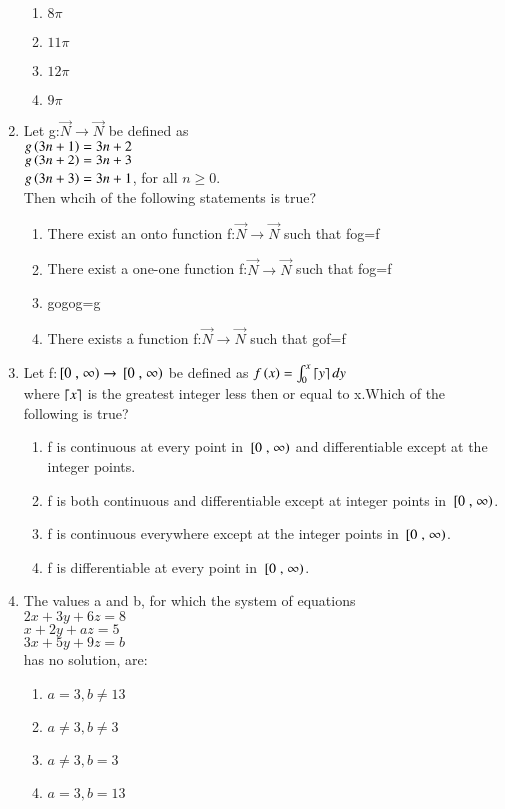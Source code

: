 \documentclass[journal,12pt,onecolumn]{IEEEtran}
\theoremstyle{remark}
\begin{document}
\begin{enumerate}
\begin{enumerate}
    \item $8\pi$
    \item $11\pi$
    \item $12\pi$
    \item $9\pi$
\end{enumerate}
\item Let g:$\vec{N} \to \vec{N}$ be defined as \\
$g\left(3n+1\right)=3n+2$\\
$g\left(3n+2\right)=3n+3$\\
$g\left(3n+3\right)=3n+1$, for all $n\geq0$.\\
Then whcih of the following statements is true?
\begin{enumerate}
    \item There exist an onto function f:$\vec{N} \to \vec{N}$ such that fog=f
    \item There exist a one-one function f:$\vec{N}\to \vec{N}$ such that fog=f
    \item gogog=g
    \item There exists a function f:$\vec{N} \to \vec{N}$ such that gof=f
\end{enumerate}
\item Let f:${}\left[0\right.,\left.\infty\right)\to {}\left[0\right.,\left.\infty\right)$ be defined as $f\left(x\right)=\int_0^x \left \lceil y \right \rceil dy$\\
where $\left \lceil x \right \rceil$ is the greatest integer less then or equal to x.Which of the following is true?
\begin{enumerate}
    \item f is continuous at every point in ${}\left[0\right.,\left.\infty\right)$ and differentiable except at the integer points.
    \item f is both continuous and differentiable except at integer points in ${}\left[0\right.,\left.\infty\right)$.
    \item f is continuous everywhere except at the integer points in ${}\left[0\right.,\left.\infty\right)$.
    \item f is differentiable at every point in ${}\left[0\right.,\left.\infty\right)$.
\end{enumerate}
\item The values a and b, for which the system of equations\\
$2x+3y+6z=8$\\
$x+2y+az=5$\\
$3x+5y+9z=b$\\
has no solution, are:
\begin{enumerate}
    \item $a=3,b\neq13$
    \item $a\neq3,b\neq3$
    \item $a\neq3,b=3$
    \item $a=3,b=13$
\end{enumerate}

\end{enumerate}
\end{document}
